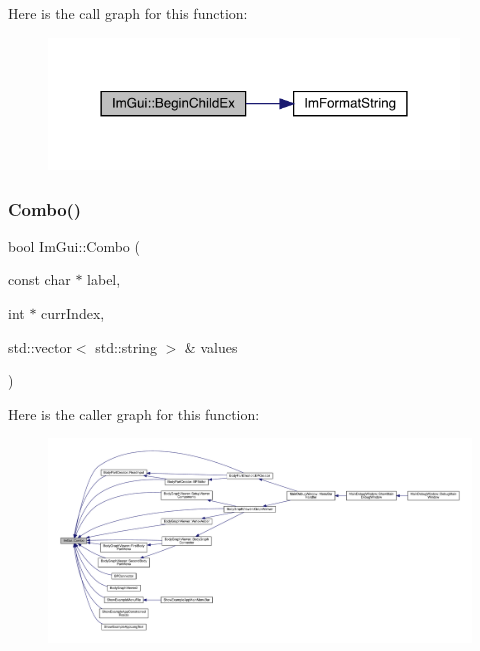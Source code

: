 Here is the call graph for this function\+:
\nopagebreak
\begin{figure}[H]
\begin{center}
\leavevmode
\includegraphics[width=309pt]{df/d13/namespace_im_gui_a2859716218e80788a82e6f76c5cf19b9_cgraph}
\end{center}
\end{figure}
\mbox{\label{namespace_im_gui_a405b19deb7db39d92f42ac1329740892}} 
\subsubsection{\texorpdfstring{Combo()}{Combo()}}
{\footnotesize\ttfamily bool Im\+Gui\+::\+Combo (\begin{DoxyParamCaption}\item[{const char $\ast$}]{label,  }\item[{int $\ast$}]{curr\+Index,  }\item[{std\+::vector$<$ std\+::string $>$ \&}]{values }\end{DoxyParamCaption})}

Here is the caller graph for this function\+:
\nopagebreak
\begin{figure}[H]
\begin{center}
\leavevmode
\includegraphics[width=350pt]{df/d13/namespace_im_gui_a405b19deb7db39d92f42ac1329740892_icgraph}
\end{center}
\end{figure}
\mbox{\label{namespace_im_gui_adfdce5dc614de9fe81b3e50c53b8f5df}} 
